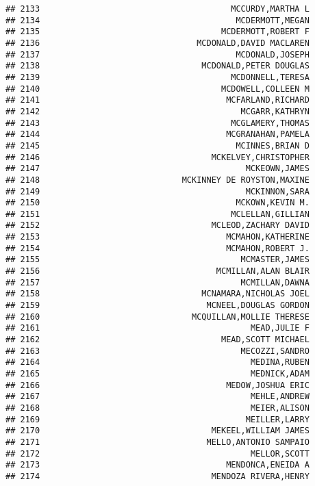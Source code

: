 \documentclass[
]{article}
\begin{document}
\begin{verbatim}
## 2133                                       MCCURDY,MARTHA L
## 2134                                        MCDERMOTT,MEGAN
## 2135                                     MCDERMOTT,ROBERT F
## 2136                                MCDONALD,DAVID MACLAREN
## 2137                                        MCDONALD,JOSEPH
## 2138                                 MCDONALD,PETER DOUGLAS
## 2139                                       MCDONNELL,TERESA
## 2140                                     MCDOWELL,COLLEEN M
## 2141                                      MCFARLAND,RICHARD
## 2142                                         MCGARR,KATHRYN
## 2143                                       MCGLAMERY,THOMAS
## 2144                                      MCGRANAHAN,PAMELA
## 2145                                        MCINNES,BRIAN D
## 2146                                   MCKELVEY,CHRISTOPHER
## 2147                                          MCKEOWN,JAMES
## 2148                             MCKINNEY DE ROYSTON,MAXINE
## 2149                                          MCKINNON,SARA
## 2150                                        MCKOWN,KEVIN M.
## 2151                                       MCLELLAN,GILLIAN
## 2152                                   MCLEOD,ZACHARY DAVID
## 2153                                      MCMAHON,KATHERINE
## 2154                                      MCMAHON,ROBERT J.
## 2155                                         MCMASTER,JAMES
## 2156                                    MCMILLAN,ALAN BLAIR
## 2157                                         MCMILLAN,DAWNA
## 2158                                 MCNAMARA,NICHOLAS JOEL
## 2159                                  MCNEEL,DOUGLAS GORDON
## 2160                               MCQUILLAN,MOLLIE THERESE
## 2161                                           MEAD,JULIE F
## 2162                                     MEAD,SCOTT MICHAEL
## 2163                                         MECOZZI,SANDRO
## 2164                                           MEDINA,RUBEN
## 2165                                           MEDNICK,ADAM
## 2166                                      MEDOW,JOSHUA ERIC
## 2167                                           MEHLE,ANDREW
## 2168                                           MEIER,ALISON
## 2169                                          MEILLER,LARRY
## 2170                                   MEKEEL,WILLIAM JAMES
## 2171                                  MELLO,ANTONIO SAMPAIO
## 2172                                           MELLOR,SCOTT
## 2173                                      MENDONCA,ENEIDA A
## 2174                                   MENDOZA RIVERA,HENRY

\end{verbatim}
\end{document}
